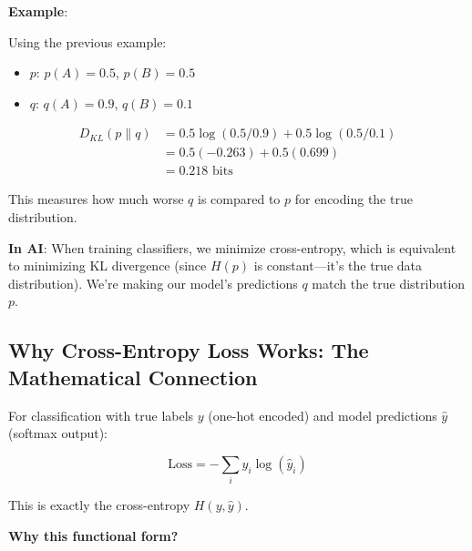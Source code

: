 \documentclass[11pt,oneside]{book}
\begin{document}
\textbf{Example}:

Using the previous example:
\begin{itemize}
\item $p$: $p(A) = 0.5$, $p(B) = 0.5$
\item $q$: $q(A) = 0.9$, $q(B) = 0.1$
\end{itemize}

\begin{align*}
D_{KL}(p \| q) &= 0.5 \log(0.5/0.9) + 0.5 \log(0.5/0.1) \\
               &= 0.5(-0.263) + 0.5(0.699) \\
               &= 0.218 \text{ bits}
\end{align*}

This measures how much worse $q$ is compared to $p$ for encoding the true distribution.

\textbf{In AI}: When training classifiers, we minimize cross-entropy, which is equivalent to minimizing KL divergence (since $H(p)$ is constant---it's the true data distribution). We're making our model's predictions $q$ match the true distribution $p$.

\subsection{Why Cross-Entropy Loss Works: The Mathematical Connection}

For classification with true labels $y$ (one-hot encoded) and model predictions $\hat{y}$ (softmax output):

\[
\text{Loss} = -\sum_{i} y_i \log(\hat{y}_i)
\]

This is exactly the cross-entropy $H(y, \hat{y})$.

\textbf{Why this functional form?}
\end{document}

